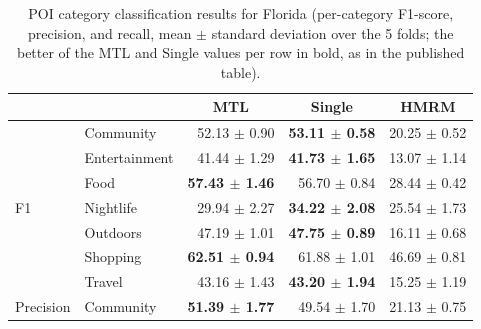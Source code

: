 \begin{table}[htbp]
\caption{POI category classification results for Florida (per-category F1-score, precision, and recall, mean $\pm$ standard deviation over the 5 folds; the better of the MTL and Single values per row in bold, as in the published table).}
\label{tab:cbic:category}
\centering
\begin{tabular}{llrrr}
\toprule
 & & \multicolumn{1}{c}{\textbf{MTL}} & \multicolumn{1}{c}{\textbf{Single}} & \multicolumn{1}{c}{\textbf{HMRM}} \\
\midrule
\multirow{7}{*}{F1}        & Community     & 52.13 $\pm$ 0.90          & \textbf{53.11 $\pm$ 0.58} & 20.25 $\pm$ 0.52 \\
                           & Entertainment & 41.44 $\pm$ 1.29          & \textbf{41.73 $\pm$ 1.65} & 13.07 $\pm$ 1.14 \\
                           & Food          & \textbf{57.43 $\pm$ 1.46} & 56.70 $\pm$ 0.84          & 28.44 $\pm$ 0.42 \\
                           & Nightlife     & 29.94 $\pm$ 2.27          & \textbf{34.22 $\pm$ 2.08} & 25.54 $\pm$ 1.73 \\
                           & Outdoors      & 47.19 $\pm$ 1.01          & \textbf{47.75 $\pm$ 0.89} & 16.11 $\pm$ 0.68 \\
                           & Shopping      & \textbf{62.51 $\pm$ 0.94} & 61.88 $\pm$ 1.01          & 46.69 $\pm$ 0.81 \\
                           & Travel        & 43.16 $\pm$ 1.43          & \textbf{43.20 $\pm$ 1.94} & 15.25 $\pm$ 1.19 \\
\midrule
\multirow{7}{*}{Precision} & Community     & \textbf{51.39 $\pm$ 1.77} & 49.54 $\pm$ 1.70          & 21.13 $\pm$ 0.75 \\

\end{tabular}
\end{table}
